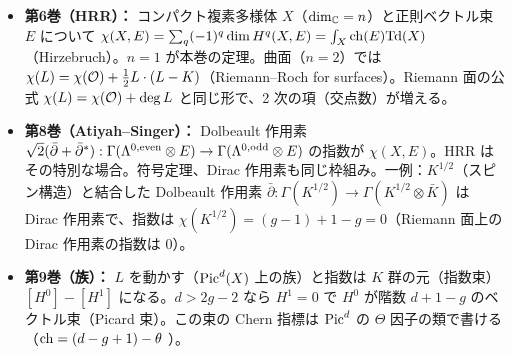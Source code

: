 \begin{center}
\end{center}
\begin{itemize}
\item \textbf{第6巻（HRR）：} コンパクト複素多様体 $X$（$\dim_\mathbb C=n$）と正則ベクトル束 $E$ について $\chi(X,E)=\sum_q(-1)^q\dim H^q(X,E)=\int_X\mathrm{ch}(E)\mathrm{Td}(X)$（Hirzebruch）。$n=1$ が本巻の定理。曲面（$n=2$）では $\chi(L)=\chi(\mathcal O)+\frac12L\cdot(L-K)$（Riemann--Roch for surfaces）。Riemann 面の公式 $\chi(L)=\chi(\mathcal O)+\deg L$ と同じ形で、2 次の項（交点数）が増える。
\item \textbf{第8巻（Atiyah--Singer）：} Dolbeault 作用素 $\sqrt2(\bar\partial+\bar\partial^*):\Gamma(\Lambda^{0,\rm even}\otimes E)\to\Gamma(\Lambda^{0,\rm odd}\otimes E)$ の指数が $\chi(X,E)$。HRR はその特別な場合。符号定理、Dirac 作用素も同じ枠組み。一例：$K^{1/2}$（スピン構造）と結合した Dolbeault 作用素 $\bar\partial:\Gamma(K^{1/2})\to\Gamma(K^{1/2}\otimes\bar K)$ は Dirac 作用素で、指数は $\chi(K^{1/2})=(g-1)+1-g=0$（Riemann 面上の Dirac 作用素の指数は $0$）。
\item \textbf{第9巻（族）：} $L$ を動かす（$\mathrm{Pic}^d(X)$ 上の族）と指数は $K$ 群の元（指数束）$[H^0]-[H^1]$ になる。$d>2g-2$ なら $H^1=0$ で $H^0$ が階数 $d+1-g$ のベクトル束（Picard 束）。この束の Chern 指標は $\mathrm{Pic}^d$ の $\Theta$ 因子の類で書ける（$\mathrm{ch}=(d-g+1)-\theta$ \tQ）。
\end{itemize}

